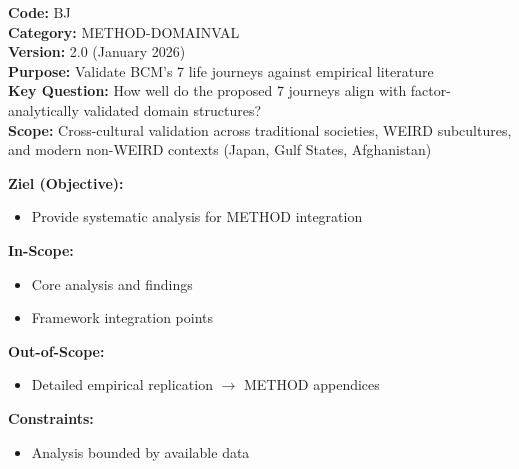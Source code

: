 \begin{tcolorbox}[colback=blue!5!white, colframe=blue!75!black, title=Appendix Overview]
\textbf{Code:} BJ \\
\textbf{Category:} METHOD-DOMAINVAL \\
\textbf{Version:} 2.0 (January 2026) \\
\textbf{Purpose:} Validate BCM's 7 life journeys against empirical literature \\
\textbf{Key Question:} How well do the proposed 7 journeys align with factor-analytically validated domain structures? \\
\textbf{Scope:} Cross-cultural validation across traditional societies, WEIRD subcultures, and modern non-WEIRD contexts (Japan, Gulf States, Afghanistan)
\end{tcolorbox}


\begin{tcolorbox}[
    colback=orange!5!white,
    colframe=orange!75!black,
    title={\textbf{Appendix Scope: Ziel / In-Scope / Out-of-Scope / Constraints}},
    fonttitle=\bfseries
]

\textbf{Ziel (Objective):}
\begin{itemize}[nosep]
    \item Provide systematic analysis for METHOD integration
\end{itemize}

\textbf{In-Scope:}
\begin{itemize}[nosep]
    \item Core analysis and findings
    \item Framework integration points
\end{itemize}

\textbf{Out-of-Scope:}
\begin{itemize}[nosep]
    \item Detailed empirical replication $\rightarrow$ METHOD appendices
\end{itemize}

\textbf{Constraints:}
\begin{itemize}[nosep]
    \item Analysis bounded by available data
\end{itemize}

\end{tcolorbox}


